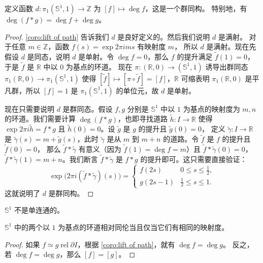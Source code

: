 \documentclass[fontset=none]{Notes}
\DeclareMathOperator\rel{rel}
\newcommand{\partI}{\partial I}
\newcommand{\relhomo}{\rel\partI}
\begin{document}
\begin{theorem}
  定义函数 $d:\pi_1(\mathbb{S}^1,1)\to \mathbb{Z}$ 为 $[f]\mapsto \deg f$，这是一个群同构。
  特别地，有 $\deg (f*g)=\deg f+\deg g$。
\end{theorem}
\begin{proof}
  \autoref{coro:lift of path} 告诉我们 $d$ 是良好定义的。然后我们说明 $d$ 是满射。
  对于任意 $m\in \mathbb{Z}$，函数 $f(s)=\exp 2\pi i ms$ 有映射度 $m$，
  所以 $d$ 是满射。现在先假设 $d$ 是同态，说明 $d$ 是单射。令 $\deg f=0$，那么
  $f$ 的提升满足 $\tilde f(1)=0$，于是 $\tilde f$ 是 $\mathbb{R}$ 中以 $0$ 为基点的环道。
  现在 $\pi:(\mathbb{R},0)\to (\mathbb{S}^1,1)$ 诱导出群同态 $\pi_1(\mathbb{R},0)\to \pi_1(\mathbb{S}^1,1)$
  使得 $[\tilde f]\mapsto [\pi\circ \tilde f]=[f]$，$\mathbb{R}$ 可缩表明 $\pi_1(\mathbb{R},0)$
  是平凡群，所以 $[f]=1$ 是 $\pi_1(\mathbb{S}^1,1)$ 的单位元，故 $d$ 是单射。
  
  现在只需要说明 $d$ 是群同态。假设 $f,g$ 分别是 $\mathbb{S}^1$ 中以 $1$ 为基点的映射度为
  $m,n$ 的环道。我们需要计算 $\deg(f*g)$，也即寻找道路 $\tilde h:I\to \mathbb{R}$ 使得
  $\exp 2\pi i \tilde h=f*g$ 且 $\tilde h(0)=0$。设 $\tilde g$ 是 $g$ 的提升且 $\tilde g(0)=0$，
  定义 $\tilde \gamma:I\to \mathbb{R}$ 是 $\tilde{\gamma}(s)=m+\tilde g(s)$，此时
  $\tilde{\gamma}$ 是从 $m$ 到 $m+n$ 的道路。令 $\tilde f$ 是 $f$ 的提升且 $\tilde f(0)=0$，
  那么 $\tilde f*\tilde \gamma$ 有意义（因为 $\tilde f(1)=\deg f=m$）且 
  $\tilde f*\tilde \gamma(0)=0$，$\tilde f*\tilde \gamma(1)=m+n$。我们断言
  $\tilde{f}*\tilde{\gamma}$ 是 $f*g$ 的提升即可。这只需要直接验证：
  \[
    \exp\bigl(2\pi i(\tilde f*\tilde \gamma)(s)\bigr)=\begin{cases}
      f(2s) & 0\leq s\leq \frac{1}{2},\\
      g(2s-1) & \frac{1}{2}\leq s\leq 1.
    \end{cases}
  \]
  这就说明了 $d$ 是群同构。
\end{proof}

\begin{corollary}
  $\mathbb{S}^1$ 不是单连通的。
\end{corollary}

\begin{corollary}
  $\mathbb{S}^1$ 中的两个以 $1$ 为基点的环道相对同伦当且仅当它们有相同的映射度。
\end{corollary}
\begin{proof}
  如果 $f\simeq g\relhomo$，根据 \autoref{coro:lift of path}，就有 $\deg f=\deg g$。
  反之，若 $\deg f=\deg g$，那么 $[f]=[g]$。
\end{proof}
\end{document}
